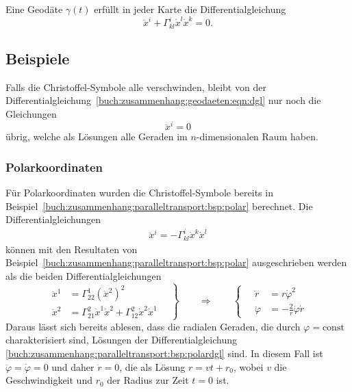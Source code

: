 \begin{satz}
Eine Geodäte $\gamma(t)$ erfüllt in jeder Karte die Differentialgleichung
\begin{equation}
\ddot{x}^i
+
\Gamma^i_{kl} \dot{x}^l \dot{x}^k
=
0.
\label{buch:zusammenhang:geodaeten:eqn:dgl}
\end{equation}
\end{satz}

%
%
\subsection{Beispiele
\label{buch:zusammenhang:geodaeten:subsection:beispiele}}
Falls die Christoffel-Symbole alle verschwinden, bleibt von der
Differentialgleichung~\eqref{buch:zusammenhang:geodaeten:eqn:dgl}
nur noch die Gleichungen
\[
\ddot{x}^i = 0
\]
übrig, welche als Lösungen alle Geraden im $n$-dimensionalen
Raum haben.

%
%
\subsubsection{Polarkoordinaten}
Für Polarkoordinaten wurden die Christoffel-Symbole bereits
in Beispiel~\ref{buch:zusammenhang:paralleltransport:bsp:polar}
berechnet.
Die Differentialgleichungen
\begin{align*}
\ddot{x}^i=-\Gamma^i_{kl}\dot{x}^k\dot{x}^l
\end{align*}
können mit den Resultaten von 
Beispiel~\ref{buch:zusammenhang:paralleltransport:bsp:polar}
ausgeschrieben werden als die beiden Differentialgleichungen
\begin{equation}
\left.
\begin{aligned}
\ddot{x}^1
&=
\Gamma^1_{22}(\dot{x}^2)^2
\\
\ddot{x}^2
&=
\Gamma^2_{21}\dot{x}^1\dot{x}^2
+
\Gamma^2_{12}\dot{x}^2\dot{x}^1
\end{aligned}
\quad
\right\}
\qquad
\Rightarrow
\qquad
\left\{
\quad
\begin{aligned}
\ddot{r}
&=
r \dot{\varphi}^2
\\
\ddot{\varphi}
&=
-\frac{2}{r}\dot{\varphi}\dot{r}
\end{aligned}
\right.
\label{buch:zusammenhang:paralleltransport:bsp:polardgl}
\end{equation}
Daraus lässt sich bereits ablesen, dass die radialen Geraden, die
durch $\varphi=\text{const}$ charakterisiert sind, Lösungen
der Differentialgleichung
\eqref{buch:zusammenhang:paralleltransport:bsp:polardgl}
sind.
In diesem Fall ist $\ddot{\varphi}=\dot{\varphi}=0$ und
daher $\ddot{r}=0$, die als Lösung $r=vt+r_0$, wobei $v$ die Geschwindigkeit
und $r_0$ der Radius zur Zeit $t=0$ ist.

